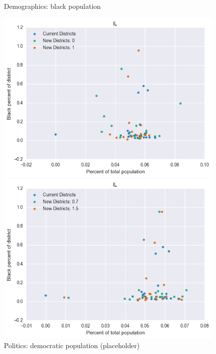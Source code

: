 \begin{figure}[htb!] \centering
\caption{ Demographics: black population }
\includegraphics[width=4.5in]{../analysis/IL/analysis_scatter.png}
\caption{ Politics: democratic population (placeholder)}
\includegraphics[width=4.5in]{../analysis/IL/analysis_scatter2.png}
\end{figure}

\clearpage
\newpage

